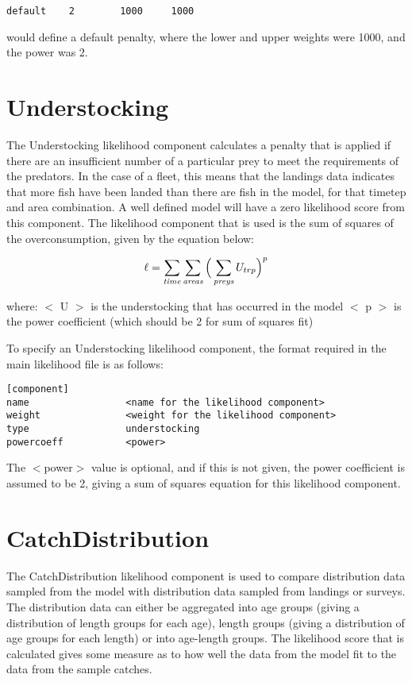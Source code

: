 \documentclass[10pt,twoside]{book}
\begin{document}
{\small\begin{verbatim}
default    2        1000     1000
\end{verbatim}}

would define a default penalty, where the lower and upper weights were 1000, and the power was 2.

\section{Understocking}\label{sec:understocking}
The Understocking likelihood component calculates a penalty that is applied if there are an insufficient number of a particular prey to meet the requirements of the predators.  In the case of a fleet, this means that the landings data indicates that more fish have been landed than there are fish in the model, for that timetep and area combination.  A well defined model will have a zero likelihood score from this component.  The likelihood component that is used is the sum of squares of the overconsumption, given by the equation below:

\begin{equation}\label{eq:understocking}
\ell = \sum_{\it time}\sum_{\it areas} \Big(\sum_{\it preys} U_{trp} \Big)^p
\end{equation}

where:\newline
$<$ U $>$ is the understocking that has occurred in the model\newline
$<$ p $>$ is the power coefficient (which should be 2 for sum of squares fit)

\bigskip
To specify an Understocking likelihood component, the format required in the main likelihood file is as follows:

{\small\begin{verbatim}
[component]
name                 <name for the likelihood component>
weight               <weight for the likelihood component>
type                 understocking
powercoeff           <power>
\end{verbatim}}

The $<$power$>$ value is optional, and if this is not given, the power coefficient is assumed to be 2, giving a sum of squares equation for this likelihood component.

\section{CatchDistribution}\label{sec:catchdist}
The CatchDistribution likelihood component is used to compare distribution data sampled from the model with distribution data sampled from landings or surveys.  The distribution data can either be aggregated into age groups (giving a distribution of length groups for each age), length groups (giving a distribution of age groups for each length) or into age-length groups.  The likelihood score that is calculated gives some measure as to how well the data from the model fit to the data from the sample catches.
\end{document}
